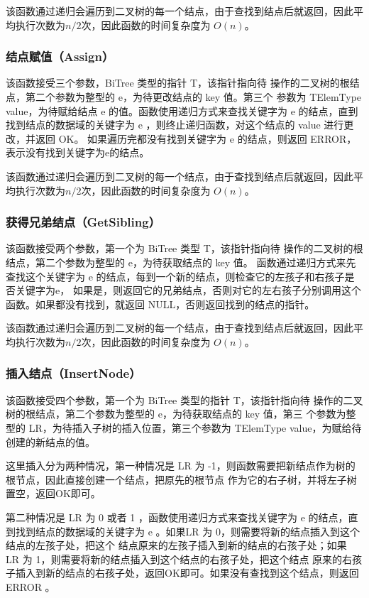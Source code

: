 \documentclass[supercite]{Experimental_Report}
\theoremstyle{definition}
\begin{document}
该函数通过递归会遍历到二叉树的每一个结点，由于查找到结点后就返回，因此平均执行次数为$n/2$次，因此函数的时间复杂度为 $O(n)$。

\subsubsection{结点赋值（Assign）}

该函数接受三个参数，BiTree 类型的指针 T，该指针指向待
操作的二叉树的根结点，第二个参数为整型的 e，为待更改结点的 key 值。第三个
参数为 TElemType value，为待赋给结点 e 的值。函数使用递归方式来查找关键字为 e
的结点，直到找到结点的数据域的关键字为 e ，则终止递归函数，对这个结点的 value 进行更改，并返回 OK。
如果遍历完都没有找到关键字为 e 的结点，则返回 ERROR，表示没有找到关键字为e的结点。

该函数通过递归会遍历到二叉树的每一个结点，由于查找到结点后就返回，因此平均执行次数为$n/2$次，因此函数的时间复杂度为 $O(n)$。

\subsubsection{获得兄弟结点（GetSibling）}

该函数接受两个参数，第一个为 BiTree 类型 T，该指针指向待
操作的二叉树的根结点，第二个参数为整型的 e，为待获取结点的 key 值。
函数通过递归方式来先查找这个关键字为 e 的结点，每到一个新的结点，则检查它的左孩子和右孩子是否关键字为e，
如果是，则返回它的兄弟结点，否则对它的左右孩子分别调用这个函数。如果都没有找到，就返回 NULL，否则返回找到的结点的指针。

该函数通过递归会遍历到二叉树的每一个结点，由于查找到结点后就返回，因此平均执行次数为$n/2$次，因此函数的时间复杂度为 $O(n)$。

\subsubsection{插入结点（InsertNode）}

该函数接受四个参数，第一个为 BiTree 类型的指针 T，该指针指向待
操作的二叉树的根结点，第二个参数为整型的 e，为待获取结点的 key 值，第三
个参数为整型的 LR，为待插入子树的插入位置，第三个参数为 TElemType value，为赋给待创建的新结点的值。

这里插入分为两种情况，第一种情况是 LR 为 -1，则函数需要把新结点作为树的根节点，因此直接创建一个结点，把原先的根节点
作为它的右子树，并将左子树置空，返回OK即可。

第二种情况是 LR 为 0 或者 1 ，函数使用递归方式来查找关键字为 e
的结点，直到找到结点的数据域的关键字为 e 。如果LR 为 0，则需要将新的结点插入到这个结点的左孩子处，把这个
结点原来的左孩子插入到新的结点的右孩子处；如果 LR 为 1，则需要将新的结点插入到这个结点的右孩子处，把这个结点
原来的右孩子插入到新的结点的右孩子处，返回OK即可。如果没有查找到这个结点，则返回 ERROR 。
\end{document}

